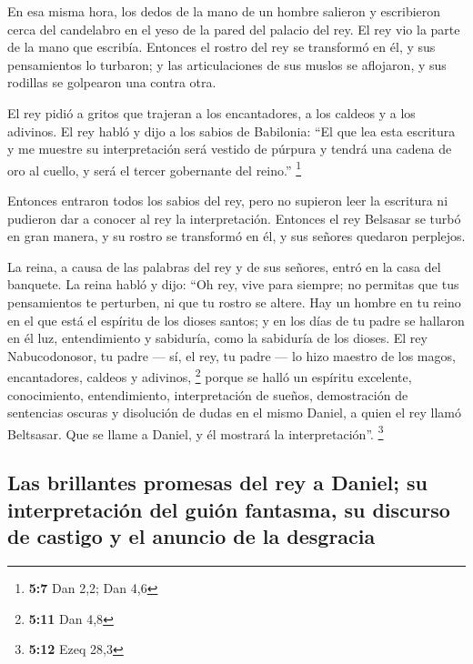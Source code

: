  En esa misma hora, los dedos de la mano de un hombre
salieron y escribieron cerca del candelabro en el yeso de la pared del
palacio del rey. El rey vio la parte de la mano que escribía.
 Entonces el rostro del rey se transformó en él, y sus
pensamientos lo turbaron; y las articulaciones de sus muslos se
aflojaron, y sus rodillas se golpearon una contra otra.

 El rey pidió a gritos que trajeran a los encantadores, a
los caldeos y a los adivinos. El rey habló y dijo a los sabios de
Babilonia: ``El que lea esta escritura y me muestre su interpretación
será vestido de púrpura y tendrá una cadena de oro al cuello, y será el
tercer gobernante del reino.'' \footnote{\textbf{5:7} Dan 2,2; Dan 4,6}

 Entonces entraron todos los sabios del rey, pero no
supieron leer la escritura ni pudieron dar a conocer al rey la
interpretación.  Entonces el rey Belsasar se turbó en gran
manera, y su rostro se transformó en él, y sus señores quedaron
perplejos.

 La reina, a causa de las palabras del rey y de sus
señores, entró en la casa del banquete. La reina habló y dijo: ``Oh rey,
vive para siempre; no permitas que tus pensamientos te perturben, ni que
tu rostro se altere.  Hay un hombre en tu reino en el que
está el espíritu de los dioses santos; y en los días de tu padre se
hallaron en él luz, entendimiento y sabiduría, como la sabiduría de los
dioses. El rey Nabucodonosor, tu padre --- sí, el rey, tu padre --- lo
hizo maestro de los magos, encantadores, caldeos y adivinos, \footnote{\textbf{5:11}
  Dan 4,8}  porque se halló un espíritu excelente,
conocimiento, entendimiento, interpretación de sueños, demostración de
sentencias oscuras y disolución de dudas en el mismo Daniel, a quien el
rey llamó Beltsasar. Que se llame a Daniel, y él mostrará la
interpretación''. \footnote{\textbf{5:12} Ezeq 28,3}

\hypertarget{las-brillantes-promesas-del-rey-a-daniel-su-interpretaciuxf3n-del-guiuxf3n-fantasma-su-discurso-de-castigo-y-el-anuncio-de-la-desgracia}{%
\subsection{Las brillantes promesas del rey a Daniel; su interpretación
del guión fantasma, su discurso de castigo y el anuncio de la
desgracia}\label{las-brillantes-promesas-del-rey-a-daniel-su-interpretaciuxf3n-del-guiuxf3n-fantasma-su-discurso-de-castigo-y-el-anuncio-de-la-desgracia}}

